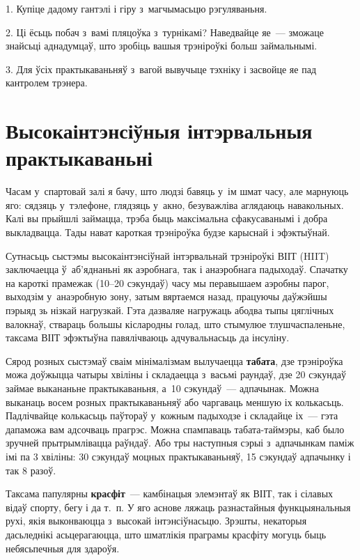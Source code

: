 1. Купіце дадому гантэлі і гіру з~магчымасьцю рэгуляваньня.

2. Ці ёсьць побач з~вамі пляцоўка з~турнікамі? Наведвайце яе~--- зможаце знайсьці аднадумцаў, што зробіць вашыя трэніроўкі больш займальнымі.

3. Для ўсіх практыкаваньняў з~вагой вывучыце тэхніку і засвойце яе пад кантролем трэнера.


\section{Высокаінтэнсіўныя інтэрвальныя практыкаваньні}

Часам у~спартовай залі я бачу, што людзі бавяць у~ім шмат часу, але марнуюць яго: сядзяць у~тэлефоне, глядзяць у~акно, безуважліва аглядаюць навакольных. Калі вы прыйшлі займацца, трэба быць максімальна сфакусаванымі і добра выкладвацца. Тады нават кароткая трэніроўка будзе карыснай і эфэктыўнай.

Сутнасьць сыстэмы высокаінтэнсіўнай інтэрвальнай трэніроўкі ВІІТ (HIIT) заключаецца ў~аб'яднаньні як аэробнага, так і анаэробнага падыходаў. Спачатку на кароткі прамежак (10--20 сэкундаў) часу мы перавышаем аэробны парог, выходзім у~анаэробную зону, затым вяртаемся назад, працуючы даўжэйшы пэрыяд зь нізкай нагрузкай. Гэта дазваляе нагружаць абодва тыпы цяглічных валокнаў, ствараць большы кіслародны голад, што стымулюе тлушчаспаленьне, таксама ВІІТ эфэктыўна павялічваюць адчувальнасьць да інсуліну. 


Сярод розных сыстэмаў сваім мінімалізмам вылучаецца \textbf{табата}, дзе трэніроўка можа доўжыцца чатыры хвіліны і складаецца з~васьмі раундаў, дзе 20 сэкундаў займае выкананьне практыкаваньня, а~10 сэкундаў~--- адпачынак. Можна выканаць восем розных практыкаваньняў або чаргаваць меншую іх колькасьць. Падлічвайце колькасьць паўтораў у~кожным падыходзе і складайце іх~--- гэта дапаможа вам адсочваць прагрэс. Можна спампаваць табата-таймэры, каб было зручней прытрымлівацца раўндаў. Або тры наступныя сэрыі з~адпачынкам паміж імі па 3 хвіліны: 30 сэкундаў моцных практыкаваньняў, 15 сэкундаў адпачынку і так 8 разоў.

Таксама папулярны \textbf{красфіт}~--- камбінацыя элемэнтаў як ВІІТ, так і сілавых відаў спорту, бегу і да т.~п. У яго аснове ляжаць разнастайныя функцыянальныя рухі, якія выконваюцца з~высокай інтэнсіўнасьцю. Зрэшты, некаторыя дасьледнікі асьцерагаюцца, што шматлікія праграмы красфіту могуць быць небясьпечныя для здароўя.

